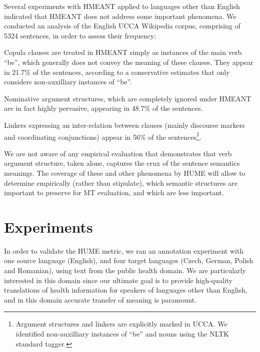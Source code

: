 \documentclass[11pt]{article}
\def\parcite#1{\cite{#1}}
\begin{document}
Several experiments with HMEANT applied to languages other than English
\parcite{bojar:wu:ssst:2012,birch-EtAl:2013:WMT,chuchunkov-tarelkin-galinskaya:2014:SSST-8}
indicated that HMEANT does not address some important phenomena.
We conducted an analysis of the English UCCA Wikipedia
corpus, comprising
of 5324 sentences,
in order to assess their frequency: \begin{inparadesc}
\item[Copula clauses] are treated in HMEANT simply as instances of the main verb ``be'', which
generally does not convey the meaning of these clauses. They appear in 21.7\% of the sentences,
according to a conservative estimates that only considers non-auxilliary instances of ``be''.
\item[Nominative argument structures,] which are completely ignored under HMEANT are in fact highly
pervasive, appearing in 48.7\% of the sentences.
\item[Linkers] expressing an inter-relation between
clauses (mainly discourse markers and coordinating conjunctions) appear in 56\% of the
sentences\footnote{Argument structures and linkers are explicitly marked in UCCA. We identified
  non-auxilliary instances of ``be'' and nouns using the NLTK standard tagger.}.
\end{inparadesc}


We are not aware of any empirical evaluation that demonstrates that verb argument structure,
taken alone, captures the crux of the sentence semantics meanings.
The coverage of
these and other phenomena by HUME will allow to determine empirically
(rather than stipulate), which semantic structures are important
to preserve for MT evaluation, and which are less important.




\section{Experiments}\label{sec:experiments}


In order to validate the HUME metric, we ran an annotation experiment with one source language (English), and four 
target languages (Czech, German, Polish and Romanian), using text from the public health domain. We are 
particularly interested in this domain since our ultimate goal is to provide high-quality translations of health
information for speakers of languages other than English, and in this domain accurate transfer of meaning is
paramount.
\end{document}
